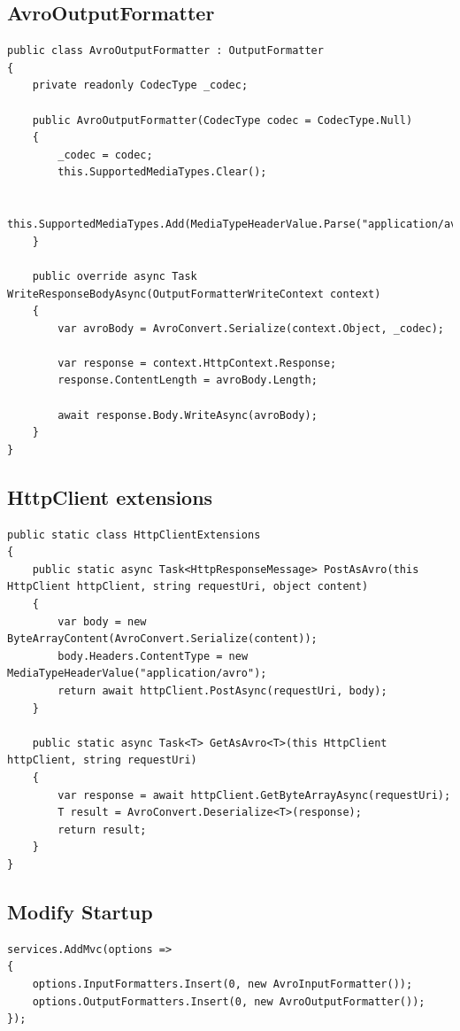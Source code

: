 \documentclass[]{article}
\begin{document}
\subsection{AvroOutputFormatter}

\begin{lstlisting}[language={[Sharp]C}, label={Script}]
public class AvroOutputFormatter : OutputFormatter
{
    private readonly CodecType _codec;

    public AvroOutputFormatter(CodecType codec = CodecType.Null)
    {
        _codec = codec;
        this.SupportedMediaTypes.Clear();

        this.SupportedMediaTypes.Add(MediaTypeHeaderValue.Parse("application/avro"));
    }

    public override async Task WriteResponseBodyAsync(OutputFormatterWriteContext context)
    {
        var avroBody = AvroConvert.Serialize(context.Object, _codec);

        var response = context.HttpContext.Response;
        response.ContentLength = avroBody.Length;

        await response.Body.WriteAsync(avroBody);
    }
}
\end{lstlisting}

\subsection{HttpClient extensions}

\begin{lstlisting}[language={[Sharp]C}, label={Script}]
public static class HttpClientExtensions
{
	public static async Task<HttpResponseMessage> PostAsAvro(this HttpClient httpClient, string requestUri, object content)
	{
		var body = new ByteArrayContent(AvroConvert.Serialize(content));
		body.Headers.ContentType = new MediaTypeHeaderValue("application/avro");
		return await httpClient.PostAsync(requestUri, body);
	}
	
	public static async Task<T> GetAsAvro<T>(this HttpClient httpClient, string requestUri)
	{
		var response = await httpClient.GetByteArrayAsync(requestUri);
		T result = AvroConvert.Deserialize<T>(response);
		return result;
	}
}
\end{lstlisting}


\subsection{Modify Startup}
\begin{lstlisting}[language={[Sharp]C}, label={Script}]
services.AddMvc(options =>
{
	options.InputFormatters.Insert(0, new AvroInputFormatter());
	options.OutputFormatters.Insert(0, new AvroOutputFormatter());
});
\end{lstlisting}
\end{document}
